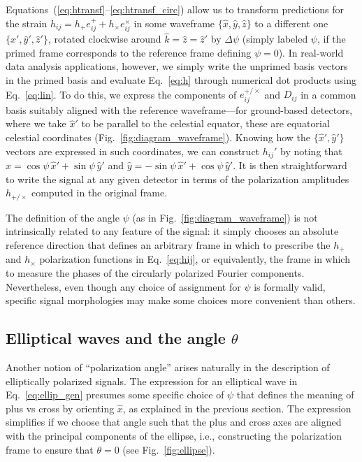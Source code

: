 \documentclass[aps,prd,twocolumn,superscriptaddress,preprintnumbers,floatfix,nofootinbib]{revtex4-2}
\newcommand*{\eq}[1]{Eq.~\eqref{eq:#1}}
\begin{document}
Equations~(\ref{eq:htransf}--\ref{eq:htransf_circ}) allow us to transform predictions for the strain $h_{ij} = h_+ e^{+}_{ij} + h_{\times} e^{\times}_{ij}$ in some waveframe $\{\hat{x}, \hat{y}, \hat{z}\}$ to a different one $\{\hat{x}', \hat{y}', \hat{z}'\}$, rotated clockwise around $\hat{k}=\hat{z}=\hat{z}'$ by $\Delta \psi$ (simply labeled $\psi$, if the primed frame corresponds to the reference frame defining $\psi=0$).
In real-world data analysis applications, however, we simply write the unprimed basis vectors in the primed basis and evaluate \eq{h} through numerical dot products using \eq{lin}.
To do this, we express the components of $e^{+/\times}_{ij}$ and $D_{ij}$ in a common basis suitably aligned with the reference waveframe---for ground-based detectors, where we take $\hat{x}'$ to be parallel to the celestial equator, these are equatorial celestial coordinates (Fig.~\ref{fig:diagram_waveframe}).
Knowing how the $\{\hat{x}', \hat{y}'\}$ vectors are expressed in such coordinates, we can construct $h_{ij}'$ by noting that $\hat{x} = \cos\psi\, \hat{x}' + \sin\psi\, \hat{y}'$ and $\hat{y}= - \sin\psi\, \hat{x}' + \cos\psi\, \hat{y}'$.
It is then straightforward to write the signal at any given detector in terms of the polarization amplitudes $h_{+/\times}$ computed in the original frame.

The definition of the angle $\psi$ (as in Fig.~\ref{fig:diagram_waveframe}) is not intrinsically related to any feature of the signal: it simply chooses an absolute reference direction that defines an arbitrary frame in which to prescribe the $h_+$ and $h_\times$ polarization functions in \eq{hij}, or equivalently, the frame in which to measure the phases of the circularly polarized Fourier components.
Nevertheless, even though any choice of assignment for $\psi$ is formally valid, specific signal morphologies may make some choices more convenient than others.

\subsection{Elliptical waves and the angle $\theta$}
\label{sec:ellip}

Another notion of ``polarization angle'' arises naturally in the description of elliptically polarized signals.
The expression for an elliptical wave in \eq{ellip_gen} presumes some specific choice of $\psi$ that defines the meaning of plus vs cross by orienting $\hat{x}$, as explained in the previous section.
The expression simplifies if we choose that angle such that the plus and cross axes are aligned with the principal components of the ellipse, i.e., constructing the polarization frame to ensure that $\theta = 0$ (see Fig.~\ref{fig:ellipse}).
\end{document}
